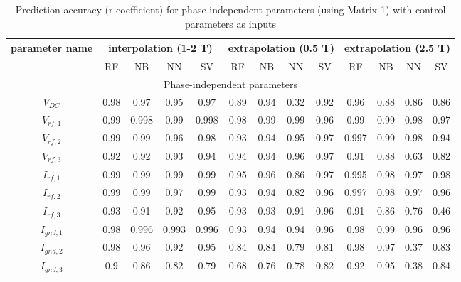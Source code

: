 \documentclass[12pt]{iopart}
\begin{document}


 

\begin{table}[]
    \centering
    
\begin{tabular}{|*{13}{c|}}  %
\hline
\multicolumn{1}{|c}{parameter name} & \multicolumn{4}{|c}{interpolation (1-2 T)} & \multicolumn{4}{|c|}{extrapolation (0.5 T)} & \multicolumn{4}{|c|}{extrapolation (2.5 T)} \\ \hline

 & RF & NB & NN & SV & RF & NB & NN & SV & RF & NB & NN & SV \\ \hline
\multicolumn{13}{c}{Phase-independent parameters} \\
        \hline
        
$V_{DC}$ & 0.98 & 0.97 & 0.95 & 0.97 & 0.89 & 0.94 & 0.32 & 0.92 & 0.96 & 0.88 & 0.86 & 0.86\\ 
$V_{rf,1}$ &0.99 &0.998 &0.99 &0.998 &0.98 &0.99 &0.99 &0.96 &0.99 &0.99 &0.98 &0.97\\
$V_{rf,2}$ &0.99 &0.99 &0.96 &0.98 &0.93 &0.94 &0.95 &0.97 & 0.997&0.99 &0.98 &0.94\\
$V_{rf,3}$ &0.92 &0.92 &0.93 &0.94 &0.94 &0.94 &0.96 &0.97 &0.91 &0.88 &0.63 &0.82\\
$I_{rf,1}$ &0.99 &0.99 &0.99 &0.99 &0.95 &0.96 &0.86 &0.97 &0.995 &0.98 &0.97 &0.98\\
$I_{rf,2}$ &0.99 &0.99 &0.97 &0.99 &0.93 &0.94 &0.82 &0.96 &0.997 &0.98 &0.97 &0.96\\
$I_{rf,3}$ &0.93 &0.91 &0.92 &0.95 &0.93 &0.93 &0.91 &0.96 &0.91 &0.86 &0.76 &0.46\\
$I_{gnd,1}$ &0.98 &0.996 &0.993 &0.996 &0.93 &0.94 &0.94 &0.96 & 0.98& 0.99& 0.96&0.96\\
$I_{gnd,2}$ &0.98 &0.96 &0.92 &0.95 &0.84 &0.84 &0.79 &0.81 &0.98 &0.97 &0.37 &0.83\\
$I_{gnd,3}$ & 0.9&0.86 &0.82 &0.79 &0.68 &0.76 &0.78 &0.82 & 0.92&0.95 &0.38 &0.84\\
 \hline
 
\end{tabular}

 \caption{Prediction accuracy (r-coefficient) for phase-independent parameters (using Matrix 1) with control parameters as inputs}
 
\end{table}
\end{document}

